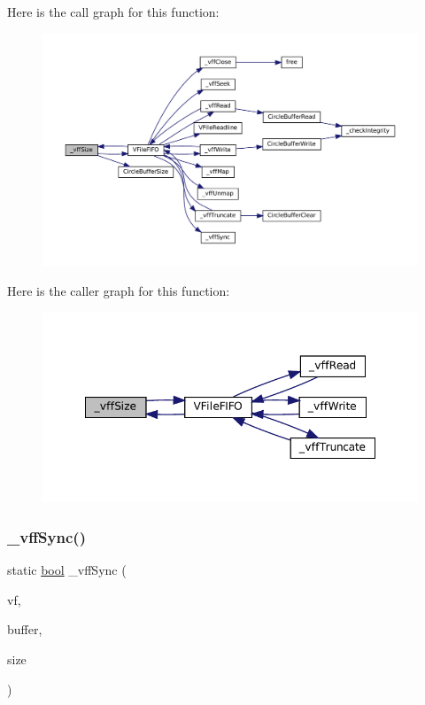 Here is the call graph for this function\+:
\nopagebreak
\begin{figure}[H]
\begin{center}
\leavevmode
\includegraphics[width=350pt]{vfs-fifo_8c_af0919c50f70e8df2e12ca7fb437a0b4b_cgraph}
\end{center}
\end{figure}
Here is the caller graph for this function\+:
\nopagebreak
\begin{figure}[H]
\begin{center}
\leavevmode
\includegraphics[width=348pt]{vfs-fifo_8c_af0919c50f70e8df2e12ca7fb437a0b4b_icgraph}
\end{center}
\end{figure}
\mbox{\label{vfs-fifo_8c_ad31804a57b1b09d56fcefadca87ba2d1}} 
\subsubsection{\texorpdfstring{\+\_\+vff\+Sync()}{\_vffSync()}}
{\footnotesize\ttfamily static \mbox{\hyperlink{libretro_8h_a4a26dcae73fb7e1528214a068aca317e}{bool}} \+\_\+vff\+Sync (\begin{DoxyParamCaption}\item[{struct V\+File $\ast$}]{vf,  }\item[{const void $\ast$}]{buffer,  }\item[{size\+\_\+t}]{size }\end{DoxyParamCaption})\hspace{0.3cm}{\ttfamily [static]}}

